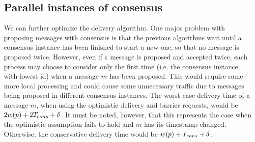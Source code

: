 \documentclass[times, 10pt]{article}
\begin{document}
% 
% 
% 
% 
% 



\subsection{Parallel instances of consensus}
\label{sec:parallel}

We can further optimize the delivery algorithm. One major problem with proposing messages with consensus is that the previous algorithms wait until a consensus instance has been finished to start a new one, so that no message is proposed twice. However, even if a message is proposed and accepted twice, each process may choose to consider only the first time (i.e. the consensus instance with lowest id) when a message $m$ has been proposed. This would require some more local processing and could cause some unnecessary traffic due to messages being proposed in different consensus instances. The worst case delivery time of a message $m$, when using the optimistic delivery and barrier requests, would be $2w(p) + 2T_{cons} + \delta$. It must be noted, however, that this represents the case when the optimistic assumption fails to hold and $m$ has its timestamp changed. Otherwise, the conservative delivery time would be $w(p) + T_{cons} + \delta$.
\end{document}
